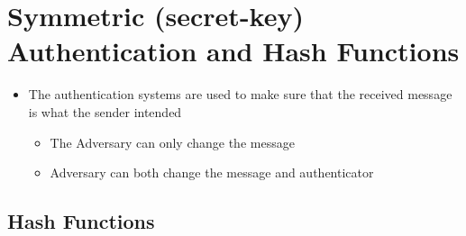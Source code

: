 \section{Symmetric (secret-key) Authentication and Hash Functions}
\begin{itemize}
  \item The authentication systems are used to make sure that the received message is what the sender intended
  \begin{itemize}
  	\item The Adversary can only change the message
  	\item Adversary can both change the message and authenticator
  \end{itemize}
\end{itemize}

\subsection{Hash Functions}
